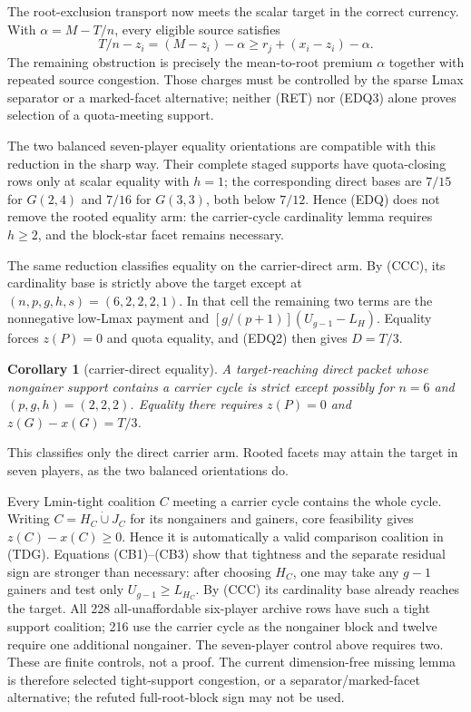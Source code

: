 \documentclass[11pt]{article}
\newtheorem{corollary}[theorem]{Corollary}
\begin{document}
The root-exclusion transport now meets the scalar target in the correct
currency.  With $\alpha=M-T/n$, every eligible source satisfies
\[
 T/n-z_i=(M-z_i)-\alpha
 \ge r_j+(x_i-z_i)-\alpha.                           \tag{EDQ3}
\]
The remaining obstruction is precisely the mean-to-root premium $\alpha$
together with repeated source congestion.  Those charges must be controlled
by the sparse Lmax separator or a marked-facet alternative; neither (RET)
nor (EDQ3) alone proves selection of a quota-meeting support.

The two balanced seven-player equality orientations are compatible with this
reduction in the sharp way.  Their complete staged supports have
quota-closing rows only at scalar equality with $h=1$; the corresponding
direct bases are $7/15$ for $G(2,4)$ and $7/16$ for $G(3,3)$, both below
$7/12$.  Hence (EDQ) does not remove the rooted equality arm: the
carrier-cycle cardinality lemma requires $h\ge2$, and the block-star facet
remains necessary.

The same reduction classifies equality on the carrier-direct arm.  By (CCC),
its cardinality base is strictly above the target except at
$(n,p,g,h,s)=(6,2,2,2,1)$.  In that cell the remaining two terms are the
nonnegative low-Lmax payment and $[g/(p+1)](U_{g-1}-L_H)$.  Equality forces
$z(P)=0$ and quota equality, and (EDQ2) then gives $D=T/3$.

\begin{corollary}[carrier-direct equality]
A target-reaching direct packet whose nongainer support contains a carrier
cycle is strict except possibly for $n=6$ and $(p,g,h)=(2,2,2)$.  Equality
there requires $z(P)=0$ and $z(G)-x(G)=T/3$.
\end{corollary}

This classifies only the direct carrier arm.  Rooted facets may attain the
target in seven players, as the two balanced orientations do.

Every Lmin-tight coalition $C$ meeting a carrier cycle contains the whole
cycle.  Writing $C=H_C\mathbin{\dot\cup}J_C$ for its nongainers and gainers,
core feasibility gives $z(C)-x(C)\ge0$.  Hence it is automatically a valid
comparison coalition in (TDG).  Equations (CB1)--(CB3) show that tightness and
the separate residual sign are stronger than necessary: after choosing $H_C$,
one may take any $g-1$ gainers and test only $U_{g-1}\ge L_{H_C}$.  By (CCC)
its cardinality base already reaches the target.  All 228 all-unaffordable
six-player archive rows have such a tight support coalition; 216 use the
carrier cycle as the nongainer block and twelve require one additional
nongainer.  The seven-player control above requires two.  These are finite
controls, not a proof.  The current dimension-free missing lemma is therefore
selected tight-support congestion, or a separator/marked-facet alternative;
the refuted full-root-block sign may not be used.
\end{document}
